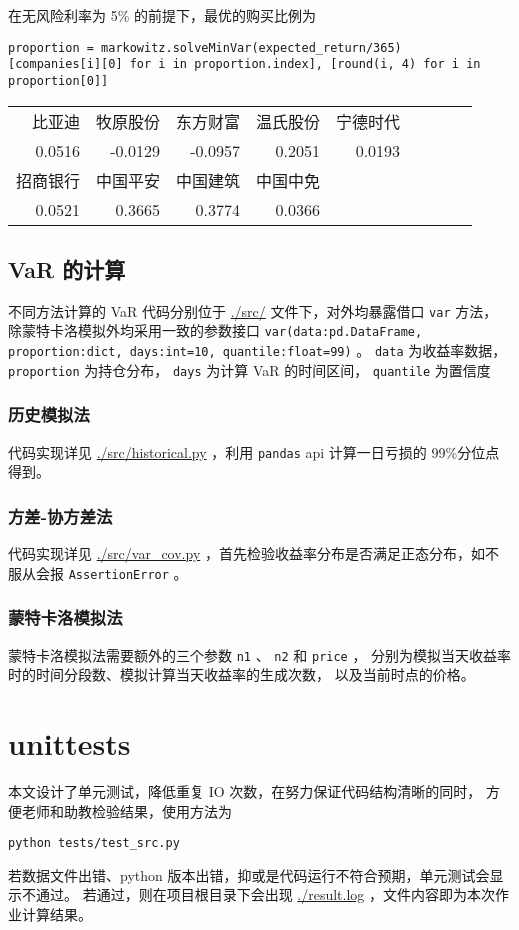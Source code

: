\documentclass[a4paper,12pt]{ctexart}
\begin{document}
在无风险利率为 5\% 的前提下，最优的购买比例为
\begin{verbatim}
proportion = markowitz.solveMinVar(expected_return/365)
[companies[i][0] for i in proportion.index], [round(i, 4) for i in proportion[0]]
\end{verbatim}

\begin{center}
\begin{tabular}{rrrrrrrrr}
比亚迪 & 牧原股份 & 东方财富 & 温氏股份 & 宁德时代 \\
0.0516 & -0.0129 & -0.0957 & 0.2051 & 0.0193 \\
招商银行 & 中国平安 & 中国建筑 & 中国中免\\
0.0521 & 0.3665 & 0.3774 & 0.0366\\
\end{tabular}
\end{center}

\subsection{VaR 的计算}
\label{sec:org6da6ec7}
不同方法计算的 VaR 代码分别位于 \url{./src/} 文件下，对外均暴露借口 \texttt{var} 方法，
除蒙特卡洛模拟外均采用一致的参数接口
\texttt{var(data:pd.DataFrame, proportion:dict, days:int=10, quantile:float=99)} 。
\texttt{data} 为收益率数据， \texttt{proportion} 为持仓分布， \texttt{days} 为计算 VaR 的时间区间， \texttt{quantile} 为置信度
\subsubsection{历史模拟法}
\label{sec:orge19e605}
代码实现详见 \url{./src/historical.py} ，利用 \texttt{pandas} api 计算一日亏损的 99\%分位点得到。
\subsubsection{方差-协方差法}
\label{sec:org701877a}
代码实现详见 \url{./src/var\_cov.py} ，首先检验收益率分布是否满足正态分布，如不服从会报 \texttt{AssertionError} 。
\subsubsection{蒙特卡洛模拟法}
\label{sec:org4def993}
蒙特卡洛模拟法需要额外的三个参数 \texttt{n1} 、 \texttt{n2} 和 \texttt{price} ，
分别为模拟当天收益率时的时间分段数、模拟计算当天收益率的生成次数，
以及当前时点的价格。
\section{unittests}
\label{sec:org2908b31}
本文设计了单元测试，降低重复 IO 次数，在努力保证代码结构清晰的同时，
方便老师和助教检验结果，使用方法为
\begin{verbatim}
python tests/test_src.py
\end{verbatim}

若数据文件出错、python 版本出错，抑或是代码运行不符合预期，单元测试会显示不通过。
若通过，则在项目根目录下会出现 \url{./result.log} ，文件内容即为本次作业计算结果。
\end{document}
